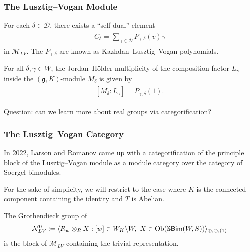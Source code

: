\documentclass{beamer}
\newcommand{\obset}{\mathrm{Ob}}
\newcommand{\textcat}[1]{\mathrm{\textsf{#1}}}
\begin{document}
\begin{frame}
\frametitle{The Lusztig--Vogan Module}
\noindent For each $\delta \in \mathscr{D}$, there exists a ``self-dual'' element
\begin{align*}
\begin{split}
C_\delta = \sum_{\gamma \in \mathscr{D}} P_{\gamma,\delta}(v)\gamma
\end{split}
\end{align*}
\noindent in $\mathcal{M}_{LV}$. The $P_{\gamma,\delta}$ are known as \textcolor{structure}{Kazhdan--Lusztig--Vogan polynomials}.\newline

\begin{theorem}[\cite{LV83}]
\noindent For all $\delta, \gamma \in W$, the Jordan--H\"{o}lder multiplicity of the composition factor $L_\gamma$ inside the $(\mathfrak{g}, K)$-module $M_\delta$ is given by
\begin{align*}
\begin{split}
[M_\delta : L_\gamma] = P_{\gamma,\delta}(1).
\end{split}
\end{align*}
\end{theorem}
\vfill
\begin{center}\textcolor{structure}{Question: can we learn more about real groups via categorification?}\end{center}
\vfill
\end{frame}

\begin{frame}
\frametitle{The Lusztig--Vogan Category}
\noindent In 2022, Larson and Romanov came up with a categorification of the principle block of the Lusztig--Vogan module as a module category over the category of Soergel bimodules.\newline

\noindent For the sake of simplicity, we will restrict to the case where $K$ is the connected component containing the identity and $T$ is Abelian.\newline

\begin{theorem}[\cite{LR22}]
\noindent The Grothendieck group of
\begin{align*}
\begin{split}
\mathcal{N}_{LV}^0 \coloneqq \langle R_w \otimes_R X : [w] \in W_K\backslash W,\ X \in \obset(\mathbb{S}\textcat{\textup{Bim}}(W, S))\rangle_{\oplus,\ominus,(1)}
\end{split}
\end{align*}
\noindent is the block of $\mathcal{M}_{LV}$ containing the trivial representation.
\end{theorem}
\end{frame}
\end{document}
